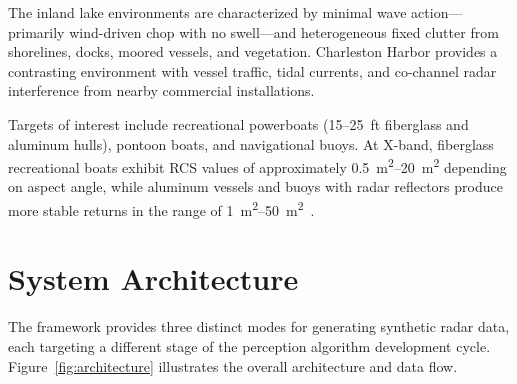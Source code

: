 \documentclass[twocolumn, 10pt]{article}
\begin{document}
The inland lake environments are characterized by minimal wave action---primarily wind-driven chop with no swell---and heterogeneous fixed clutter from shorelines, docks, moored vessels, and vegetation. Charleston Harbor provides a contrasting environment with vessel traffic, tidal currents, and co-channel radar interference from nearby commercial installations.

Targets of interest include recreational powerboats (15--25~ft fiberglass and aluminum hulls), pontoon boats, and navigational buoys. At X-band, fiberglass recreational boats exhibit RCS values of approximately \SIrange{0.5}{20}{\meter\squared} depending on aspect angle, while aluminum vessels and buoys with radar reflectors produce more stable returns in the range of \SIrange{1}{50}{\meter\squared}~\cite{knott2004radar, skolnik2001introduction}.

\section{System Architecture}
\label{sec:architecture}

The framework provides three distinct modes for generating synthetic radar data, each targeting a different stage of the perception algorithm development cycle. Figure~\ref{fig:architecture} illustrates the overall architecture and data flow.
\end{document}
